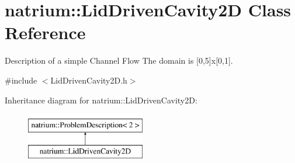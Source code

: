 \hypertarget{classnatrium_1_1LidDrivenCavity2D}{\section{natrium\-:\-:Lid\-Driven\-Cavity2\-D Class Reference}
\label{classnatrium_1_1LidDrivenCavity2D}
}


Description of a simple Channel Flow The domain is \mbox{[}0,5\mbox{]}x\mbox{[}0,1\mbox{]}.  




{\ttfamily \#include $<$Lid\-Driven\-Cavity2\-D.\-h$>$}

Inheritance diagram for natrium\-:\-:Lid\-Driven\-Cavity2\-D\-:\begin{figure}[H]
\begin{center}
\leavevmode
\includegraphics[height=2.000000cm]{classnatrium_1_1LidDrivenCavity2D}
\end{center}
\end{figure}

